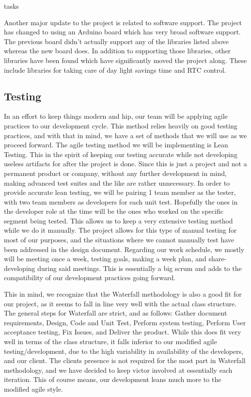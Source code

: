 tasks\documentclass[onecolumn, draftclsnofoot,10pt, compsoc]{IEEEtran}
\begin{document}
Another major update to the project is related to software support.
The project has changed to using an Arduino board which has very broad software support.
The previous board didn't actually support any of the libraries listed above whereas the new board does.
In addition to supporting those libraries, other libraries have been found which have significantly moved the project along.
These include libraries for taking care of day light savings time and RTC control.

\subsection{Testing}
In an effort to keep things modern and hip, our team will be applying agile practices to our development cycle.
This method relies heavily on good testing practices, and with that in mind, we have a set of methods that we will use as we proceed forward.
The agile testing method we will be implementing is Lean Testing.
This in the spirit of keeping our testing accurate while not developing useless artifacts for after the project is done.
Since this is just a project and not a permanent product or company, without any further development in mind, making advanced test suites and the like are rather unnecessary.
In order to provide accurate lean testing, we will be pairing 1 team member as the tester, with two team members as developers for each unit test.
Hopefully the ones in the developer role at the time will be the ones who worked on the specific segment being tested.
This allows us to keep a very extensive testing method while we do it manually.
The project allows for this type of manual testing for most of our purposes, and the situations where we cannot manually test have been addressed in the design document.
Regarding our work schedule, we mostly will be meeting once a week, testing goals, making a week plan, and share-developing during said meetings.
This is essentially a big scrum and adds to the compatibility of our development practices going forward.

This in mind, we recognize that the Waterfall methodology is also a good fit for our project, as it seems to fall in line very well with the actual class structure.
The general steps for Waterfall are strict, and as follows: Gather document requirements, Design, Code and Unit Test, Perform system testing, Perform User acceptance testing, Fix Issues, and Deliver the product.
While this does fit very well in terms of the class structure, it falls inferior to our modified agile testing/development, due to the high variability in availability of the developers, and our client.
The clients presence is not required for the most part in Waterfall methodology, and we have decided to keep victor involved at essentially each iteration.
This of course means, our development leans much more to the modified agile style.
\end{document}
